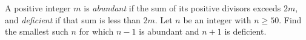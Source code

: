 A positive integer $m$ is \emph{abundant} if the sum of its positive divisors exceeds $2m$, and \emph{deficient} if that sum is less than $2m$. Let $n$ be an integer with $n\ge50$. Find the smallest such $n$ for which $n-1$ is abundant and $n+1$ is deficient.
